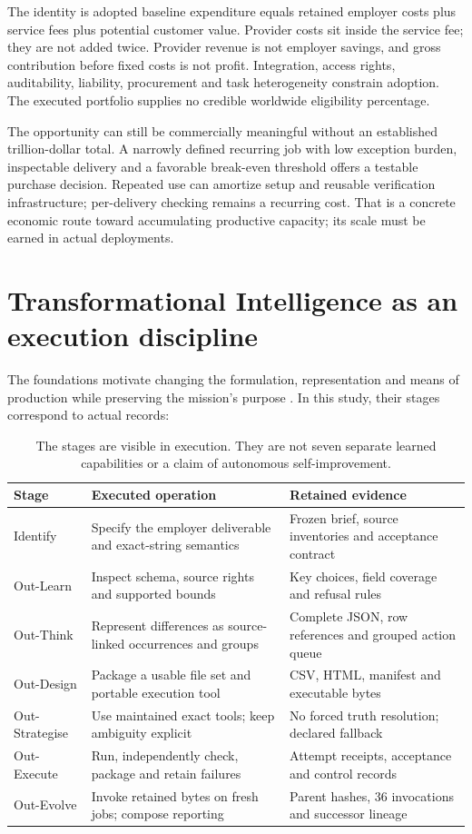\documentclass[11pt,a4paper]{article}
\newcommand{\smalltable}{\small\setlength{\tabcolsep}{5pt}}
\begin{document}
The identity is adopted baseline expenditure equals retained employer costs plus service fees plus potential customer value. Provider costs sit inside the service fee; they are not added twice. Provider revenue is not employer savings, and gross contribution before fixed costs is not profit. Integration, access rights, auditability, liability, procurement and task heterogeneity constrain adoption. The executed portfolio supplies no credible worldwide eligibility percentage.

The opportunity can still be commercially meaningful without an established trillion-dollar total. A narrowly defined recurring job with low exception burden, inspectable delivery and a favorable break-even threshold offers a testable purchase decision. Repeated use can amortize setup and reusable verification infrastructure; per-delivery checking remains a recurring cost. That is a concrete economic route toward accumulating productive capacity; its scale must be earned in actual deployments.

\section{Transformational Intelligence as an execution discipline}

The foundations motivate changing the formulation, representation and means of production while preserving the mission's purpose \citep{agialpha_foundation,transformational_intelligence}. In this study, their stages correspond to actual records:

\begin{table}[H]\centering\smalltable
\begin{tabularx}{\linewidth}{P{.17\linewidth}YY}
\toprule
Stage & Executed operation & Retained evidence\\
\midrule
Identify & Specify the employer deliverable and exact-string semantics & Frozen brief, source inventories and acceptance contract\\
Out-Learn & Inspect schema, source rights and supported bounds & Key choices, field coverage and refusal rules\\
Out-Think & Represent differences as source-linked occurrences and groups & Complete JSON, row references and grouped action queue\\
Out-Design & Package a usable file set and portable execution tool & CSV, HTML, manifest and executable bytes\\
Out-Strategise & Use maintained exact tools; keep ambiguity explicit & No forced truth resolution; declared fallback\\
Out-Execute & Run, independently check, package and retain failures & Attempt receipts, acceptance and control records\\
Out-Evolve & Invoke retained bytes on fresh jobs; compose reporting & Parent hashes, 36 invocations and successor lineage\\
\bottomrule
\end{tabularx}
\caption{The stages are visible in execution. They are not seven separate learned capabilities or a claim of autonomous self-improvement.}
\end{table}
\end{document}
